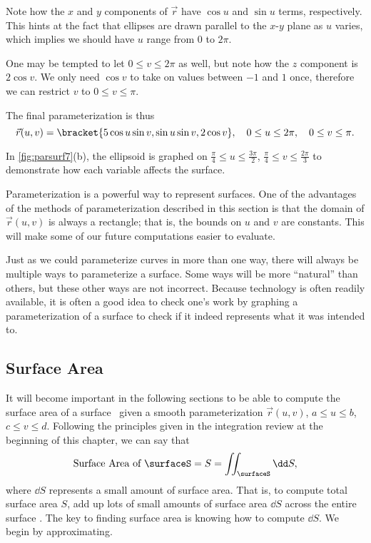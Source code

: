 \begin{example}
Note how the $x$ and $y$ components of $\vec r$ have  $\cos u$ and $\sin u$ terms, respectively. This hints at the fact that ellipses are drawn parallel to the $x$-$y$ plane as $u$ varies, which implies we should have $u$ range from $0$ to $2\pi$. 

One may be tempted to let $0\leq v\leq 2\pi$ as well, but note how the $z$ component is $2\cos v$. We only need $\cos v$ to take on values between $-1$ and $1$ once, therefore we can restrict $v$ to $0\leq v\leq \pi$. 

The final parameterization is thus
\[
\vec r(u,v) =\bracket{5\cos u\sin v, \sin u\sin v,2\cos v},
\quad 0\leq u\leq2\pi,\quad 0\leq v\leq\pi.
\]

In \autoref{fig:parsurf7}(b), the ellipsoid is graphed on $\frac{\pi}{4}\leq u\leq \frac{3\pi}{2}$, $\frac{\pi}4\leq v\leq \frac{2\pi}3$ to demonstrate how each variable affects the surface.
\end{example}

Parameterization is a powerful way to represent surfaces. One of the advantages of the methods of parameterization described in this section is that the domain of $\vec r(u,v)$ is always a rectangle; that is, the bounds on $u$ and $v$ are constants. This will make some of our future computations easier to evaluate.

Just as we could parameterize curves in more than one way, there will always be multiple ways to parameterize a surface. Some ways will be more ``natural'' than others, but these other ways are not incorrect. Because technology is often readily available, it is often a good idea to check one's work by graphing a parameterization of a surface to check if it indeed represents what it was intended to.

\subsection{Surface Area}

It will become important in the following sections to be able to compute the surface area of a surface \surfaceS\ given a smooth parameterization $\vec r(u,v)$, $a\leq u\leq b$, $c\leq v\leq d$. Following the principles given in the integration review at the beginning of this chapter, we can say that
\[\text{Surface Area of \surfaceS}=S = \iint_{\surfaceS}\dd S,\]
where $\dd S$ represents a small amount of surface area. That is, to compute total surface area $S$, add up lots of small amounts of surface area $\dd S$ across the entire surface \surfaceS. The key to finding surface area is knowing how to compute $\dd S$. We begin by approximating.

